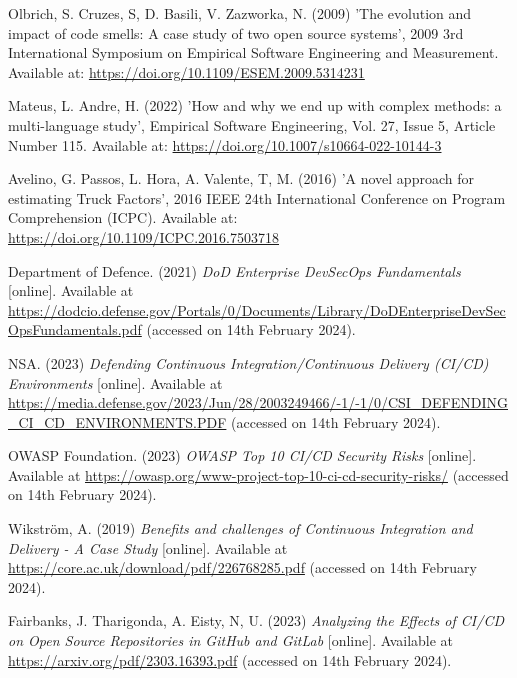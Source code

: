\noindent Olbrich, S. Cruzes, S, D. Basili, V. Zazworka, N. (2009) 'The evolution and impact of code smells: A case study of two open source systems', 2009 3rd International Symposium on Empirical Software Engineering and Measurement. Available at: \url{https://doi.org/10.1109/ESEM.2009.5314231}
\vspace{0.2cm}

\noindent Mateus, L. Andre, H. (2022) 'How and why we end up with complex methods: a multi-language study', Empirical Software Engineering, Vol. 27, Issue 5, Article Number 115. Available at: \url{https://doi.org/10.1007/s10664-022-10144-3}
\vspace{0.2cm}

\noindent Avelino, G. Passos, L. Hora, A. Valente, T, M. (2016) 'A novel approach for estimating Truck Factors', 2016 IEEE 24th International Conference on Program Comprehension (ICPC). Available at: \url{https://doi.org/10.1109/ICPC.2016.7503718}
\vspace{0.2cm}

\noindent Department of Defence. (2021) \textit{DoD Enterprise DevSecOps Fundamentals} [online]. Available at \url{https://dodcio.defense.gov/Portals/0/Documents/Library/DoDEnterpriseDevSecOpsFundamentals.pdf} (accessed on 14th February 2024).
\vspace{0.2cm}

\noindent NSA. (2023) \textit{Defending Continuous Integration/Continuous Delivery (CI/CD) Environments} [online]. Available at \url{https://media.defense.gov/2023/Jun/28/2003249466/-1/-1/0/CSI_DEFENDING_CI_CD_ENVIRONMENTS.PDF} (accessed on 14th February 2024).
\vspace{0.2cm}

\noindent OWASP Foundation. (2023) \textit{OWASP Top 10 CI/CD Security Risks} [online]. Available at \url{https://owasp.org/www-project-top-10-ci-cd-security-risks/} (accessed on 14th February 2024).
\vspace{0.2cm}

\noindent Wikström, A. (2019) \textit{Benefits and challenges of Continuous Integration and Delivery - A Case Study} [online]. Available at \url{https://core.ac.uk/download/pdf/226768285.pdf} (accessed on 14th February 2024).
\vspace{0.2cm}

\noindent Fairbanks, J. Tharigonda, A. Eisty, N, U. (2023) \textit{Analyzing the Effects of CI/CD on Open Source Repositories in GitHub and GitLab} [online]. Available at \url{https://arxiv.org/pdf/2303.16393.pdf} (accessed on 14th February 2024).
\vspace{0.2cm}

